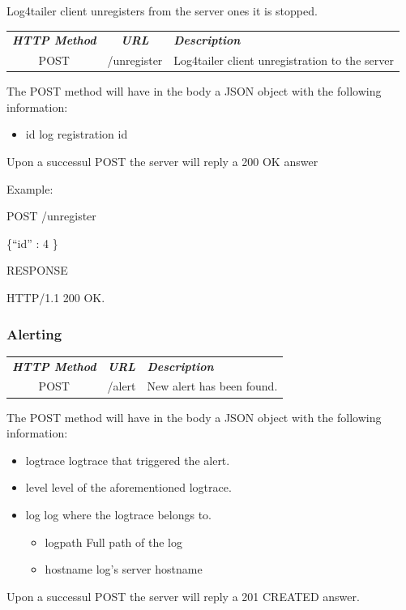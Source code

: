 Log4tailer client unregisters from the server ones it is stopped.

\begin{flushleft}
 \begin{tabular}{|c|c|l|}
 \hline 
 \rowcolor{cyan} {\color{white} \textit{\textbf{HTTP Method}}} &  {\color{white} 
  \textit{\textbf{URL}}}  & {\color{white} 
 \textit{\textbf{Description}}}\\
 POST & /unregister & Log4tailer client unregistration to the server\\
 \hline
\end{tabular}
\end{flushleft}
The POST method will have in the body a JSON object with the following information:

\begin{itemize}
 \item id log registration id 
\end{itemize}

\noindent
Upon a successul POST the server will reply a 200 OK answer

\noindent
Example:

\begin{codeexample}

POST /unregister

 \{``id'' : 4 \}

RESPONSE

HTTP/1.1 200 OK.
\end{codeexample}

\subsubsection{Alerting}

\begin{flushleft}
 \begin{tabular}{|c|c|l|}
 \hline 
 \rowcolor{cyan} {\color{white} \textit{\textbf{HTTP Method}}} &  {\color{white} 
  \textit{\textbf{URL}}}  & {\color{white} 
 \textit{\textbf{Description}}}\\
 POST & /alert & New alert has been found.\\
 \hline
\end{tabular}
\end{flushleft}
The POST method will have in the body a JSON object with the following information:

\begin{itemize}
 \item logtrace logtrace that triggered the alert.
 \item level level of the aforementioned logtrace.
 \item log log where the logtrace belongs to.
    \begin{itemize}
      \item logpath Full path of the log 
      \item hostname log's server hostname
    \end{itemize}
\end{itemize}
Upon a successul POST the server will reply a 201 CREATED answer.

